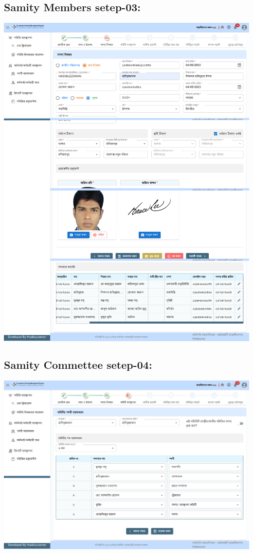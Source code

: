 \subsection{Samity Members setep-03:}
  \includegraphics[width=14cm]{Chap4/step3.png}

\subsection{Samity Commettee setep-04:}
  \includegraphics[width=14cm]{Chap4/step4.png}